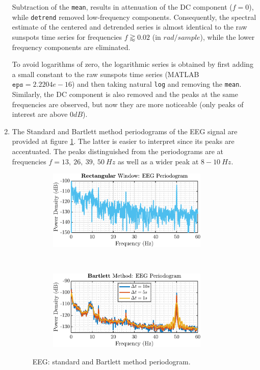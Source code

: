 \begin{enumerate}[label=\alph*), leftmargin=*]
Subtraction of the \texttt{mean}, results in attenuation of the DC component ($f = 0$), while \texttt{detrend} removed low-frequency components.
Consequently, the spectral estimate of the centered and detrended series is almost identical to the raw sunspots time series for frequencies $f \gtrapprox 0.02$ (in $rad/sample$),
while the lower frequency components are eliminated.

To avoid logarithms of zero, the logarithmic series is obtained by first adding a small constant to the raw sunspots time series (MATLAB $\mathtt{eps} = 2.2204e-16$) and then
taking natural \texttt{log} and removing the \texttt{mean}. Similarly, the DC component is also removed and the peaks at the same frequencies are observed, but now they are more noticeable
(only peaks of interest are above $0dB$).

\item
%

The Standard and Bartlett method periodograms of the EEG signal are provided at figure \ref{fig:1_4_b_1}. The latter is easier to interpret since its peaks are accentuated.
The peaks distinguished from the periodograms are at frequencies $f = 13,\ 26,\ 39,\ 50\ Hz$ as well as a wider peak at $8-10\ Hz$.

\begin{figure}[h]
    \centering
    \begin{subfigure}{0.49\textwidth}
        \centering
        \includegraphics[height=1.5in]{report/spectrum-estimation/periodogram-based-methods-applied-to-real-world-data/assets/b/eeg-periodogram-standard}
    \end{subfigure}
    ~ 
    \begin{subfigure}{0.49\textwidth}
        \centering
        \includegraphics[height=1.5in]{report/spectrum-estimation/periodogram-based-methods-applied-to-real-world-data/assets/b/eeg-periodogram-averaged-bartlett}
    \end{subfigure}
    \caption{EEG: standard and Bartlett method periodogram.}
    \label{fig:1_4_b_1}
\end{figure}


\end{enumerate}
